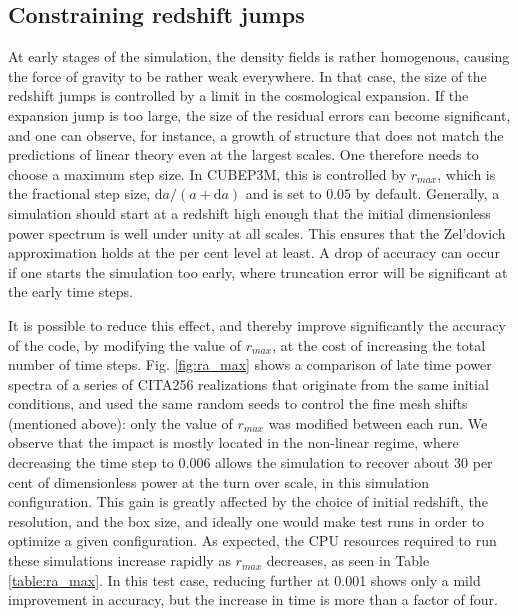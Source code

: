 \subsection{Constraining redshift jumps}

At early stages of the simulation, the density fields is rather homogenous, causing the force of gravity to be
rather weak everywhere. In that case, the size of the redshift jumps is controlled by a limit in the cosmological expansion.
If the expansion jump is too large, the size of the residual errors can become significant, and one can observe, for instance,
a growth of structure that does not match the predictions of  linear theory even at the largest scales.
One therefore needs to choose a maximum step size. In {\small CUBEP3M}, this is controlled by $r_{max}$, which is the fractional step size,
$\mbox{d}a/(a + \mbox{d}a)$ and is set to $0.05$ by default.  Generally, a simulation should start at a redshift high enough that
the initial dimensionless power spectrum is well under unity at all scales. This ensures that the Zel'dovich approximation
 holds at the per cent level at least. A drop of accuracy can occur if one starts the simulation too early, where
 truncation error will be significant at the early time steps.


It is possible to reduce this effect, and thereby improve significantly 
the accuracy of the code, by modifying the value of $r_{max}$, at the cost of increasing the total number of time steps.
Fig. \ref{fig:ra_max} shows a comparison of late time power spectra of a series of CITA256 realizations that originate from the same initial conditions, 
and used the same random seeds to control the fine mesh shifts (mentioned above): only the value of $r_{max}$ was modified between each run. 
We observe that the impact is mostly located in the non-linear regime, where decreasing the time step to 0.006 
allows the simulation to recover about 30 per cent of dimensionless power at the turn over scale, in this simulation configuration.
This gain is greatly affected by the choice of initial redshift, the resolution, and the box size, and ideally one would make
test runs in order to optimize a given configuration.  
As expected, the {\small CPU} resources required to run these simulations increase rapidly as $r_{max}$ decreases, as seen in Table \ref{table:ra_max}. 
In this test case, reducing further at 0.001 shows only a mild improvement in accuracy, but the increase in time is more than a factor of four.


